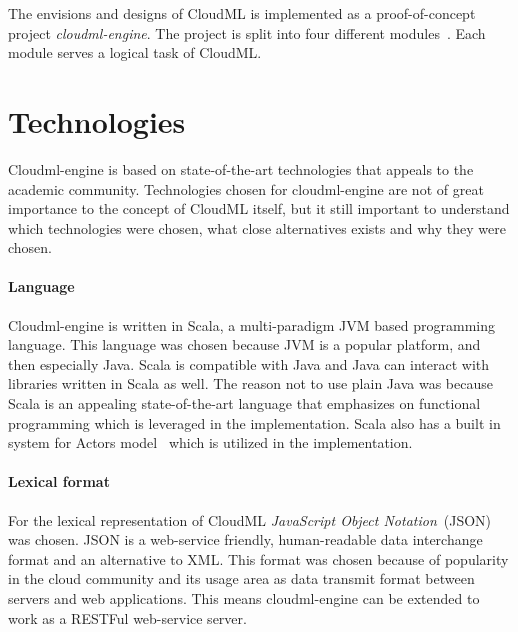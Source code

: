 


The envisions and designs of CloudML is implemented as a proof-of-concept project \emph{cloudml-engine}.
The project is split into four different modules~. 
Each module serves a logical task of CloudML.

\section{Technologies}

Cloudml-engine is based on state-of-the-art technologies that appeals to the academic community.
Technologies chosen for cloudml-engine are not of great importance to the concept of CloudML itself,
but it still important to understand which technologies were chosen, what close alternatives exists
and why they were chosen.

\paragraph{Language} 
Cloudml-engine is written in Scala, a multi-paradigm JVM based programming language.
This language was chosen because JVM is a popular platform, and then especially Java.
Scala is compatible with Java and Java can interact with libraries written in Scala as well.
The reason not to use plain Java was because Scala is an appealing state-of-the-art language that emphasizes 
on functional programming which is leveraged in the implementation.
Scala also has a built in system for Actors model~\cite{actors:haller07} which is utilized in the implementation.

\paragraph{Lexical format}
For the lexical representation of CloudML \emph{JavaScript Object Notation}~(JSON) was chosen.
JSON is a web-service friendly, human-readable data interchange format and an alternative to XML.
This format was chosen because of popularity in the cloud community 
and its usage area as data transmit format between servers and web applications.
This means cloudml-engine can be extended to work as a RESTFul web-service server.

